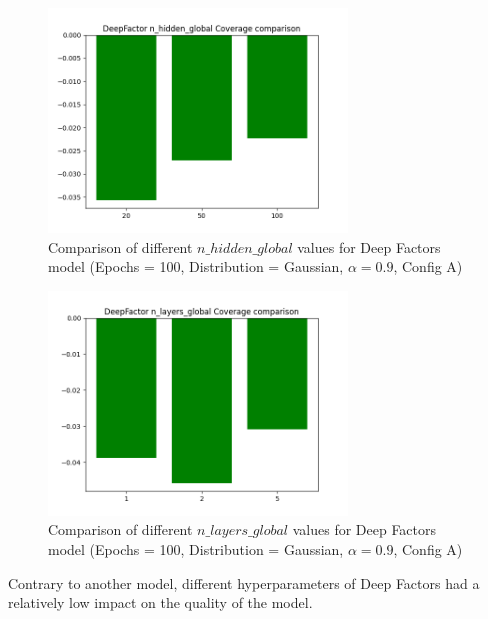 \begin{figure}[H]
    \centering
    \includegraphics[width=300px]{plots/hist/a/DeepFactor/n_hidden_global/Coverage.png}
    \caption{Comparison of different $n\_hidden\_global$ values for Deep Factors model (Epochs = 100, Distribution = Gaussian, $\alpha = 0.9$, Config A)}
    \label{fig:comp2_deepfactor_n_hidden_globals}
\end{figure}

\begin{figure}[H]
    \centering
    \includegraphics[width=300px]{plots/hist/a/DeepFactor/n_layers_global/Coverage.png}
    \caption{Comparison of different $n\_layers\_global$ values for Deep Factors model (Epochs = 100, Distribution = Gaussian, $\alpha = 0.9$, Config A)}
    \label{fig:comp2_deepfactor_n_layers_global}
\end{figure}

Contrary to another model, different hyperparameters of Deep Factors had a relatively low impact on the quality of the model.

